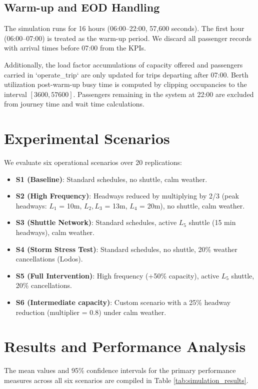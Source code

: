 \documentclass[11pt,a4paper]{article}
\begin{document}
\subsection{Warm-up and EOD Handling}
The simulation runs for 16 hours (06:00--22:00, 57,600 seconds). The first hour (06:00--07:00) is treated as the warm-up period. We discard all passenger records with arrival times before 07:00 from the KPIs. 

Additionally, the load factor accumulations of capacity offered and passengers carried in `operate_trip` are only updated for trips departing after 07:00. Berth utilization post-warm-up busy time is computed by clipping occupancies to the interval $[3600, 57600]$. Passengers remaining in the system at 22:00 are excluded from journey time and wait time calculations.

\section{Experimental Scenarios}
We evaluate six operational scenarios over 20 replications:
\begin{itemize}
    \item \textbf{S1 (Baseline)}: Standard schedules, no shuttle, calm weather.
    \item \textbf{S2 (High Frequency)}: Headways reduced by multiplying by 2/3 (peak headways: $L_1$ = 10m, $L_2, L_3$ = 13m, $L_4$ = 20m), no shuttle, calm weather.
    \item \textbf{S3 (Shuttle Network)}: Standard schedules, active $L_5$ shuttle (15 min headways), calm weather.
    \item \textbf{S4 (Storm Stress Test)}: Standard schedules, no shuttle, 20\% weather cancellations (Lodos).
    \item \textbf{S5 (Full Intervention)}: High frequency (+50\% capacity), active $L_5$ shuttle, 20\% cancellations.
    \item \textbf{S6 (Intermediate capacity)}: Custom scenario with a 25\% headway reduction (multiplier = 0.8) under calm weather.
\end{itemize}

\section{Results and Performance Analysis}
The mean values and 95\% confidence intervals for the primary performance measures across all six scenarios are compiled in Table \ref{tab:simulation_results}.
\end{document}
